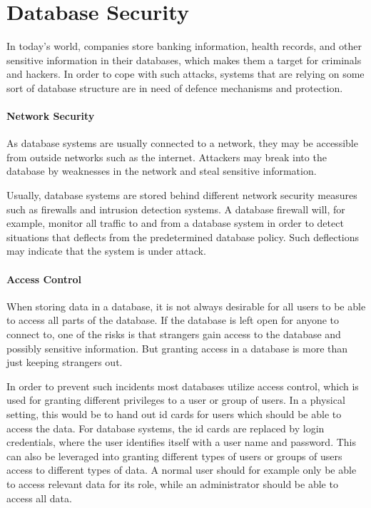 \section{Database Security}
\label{chp:database_Security}

In today's world, companies store banking information, health records, and other sensitive information in their databases, which makes them a target for criminals and hackers. In order to cope with such attacks, systems that are relying on some sort of database structure are in need of defence mechanisms and protection.

\paragraph{Network Security}

As database systems are usually connected to a network, they may be accessible from outside networks such as the internet. Attackers may break into the database by weaknesses in the network and steal sensitive information.

Usually, database systems are stored behind different network security measures such as firewalls and intrusion detection systems. A database firewall will, for example, monitor all traffic to and from a database system in order to detect situations that deflects from the predetermined database policy. Such deflections may indicate that the system is under attack.


\paragraph{Access Control}

When storing data in a database, it is not always desirable for all users to be able to access all parts of the database. If the database is left open for anyone to connect to, one of the risks is that strangers gain access to the database and possibly sensitive information. But granting access in a database is more than just keeping strangers out.

In order to prevent such incidents most databases utilize access control, which is used for granting different privileges to a user or group of users. In a physical setting, this would be to hand out id cards for users which should be able to access the data. For database systems, the id cards are replaced by login credentials, where the user identifies itself with a user name and password. This can also be leveraged into granting different types of users or groups of users access to different types of data. A normal user should for example only be able to access relevant data for its role, while an administrator should be able to access all data.

